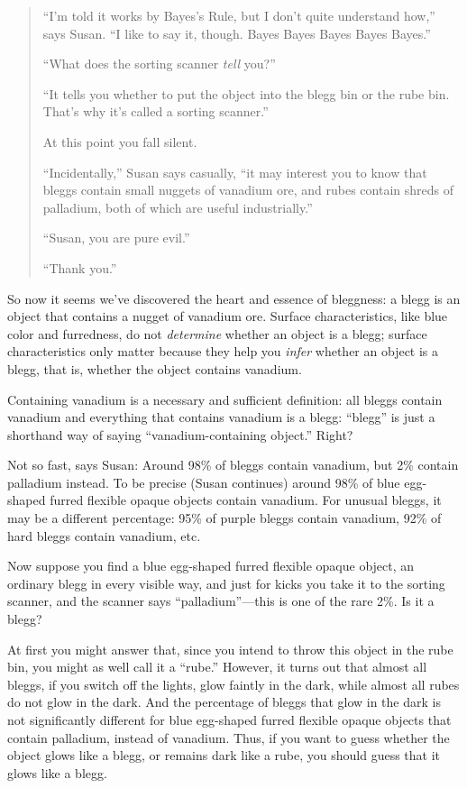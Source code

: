 {\begin{quotation}
 ``I'm told it works by
Bayes's Rule, but I don't quite
understand how,'' says Susan. ``I
like to say it, though. Bayes Bayes Bayes Bayes
Bayes.''


 ``What does the sorting scanner \textit{tell}
you?''


 ``It tells you whether to put the object into the
blegg bin or the rube bin. That's why
it's called a sorting scanner.''


 At this point you fall silent.


 ``Incidentally,'' Susan says
casually, ``it may interest you to know that bleggs
contain small nuggets of vanadium ore, and rubes contain shreds of
palladium, both of which are useful industrially.''


 ``Susan, you are pure evil.''

{
  ``Thank you.''}
\end{quotation}


 So now it seems we've discovered the heart and
essence of bleggness: a blegg is an object that contains a nugget of
vanadium ore. Surface characteristics, like blue color and furredness,
do not \textit{determine} whether an object is a blegg; surface
characteristics only matter because they help you \textit{infer}
whether an object is a blegg, that is, whether the object contains
vanadium.


 Containing vanadium is a necessary and sufficient definition: all
bleggs contain vanadium and everything that contains vanadium is a
blegg: ``blegg'' is just a shorthand
way of saying ``vanadium-containing
object.'' Right?


 Not so fast, says Susan: Around 98\% of bleggs contain vanadium,
but 2\% contain palladium instead. To be precise (Susan continues)
around 98\% of blue egg-shaped furred flexible opaque objects contain
vanadium. For unusual bleggs, it may be a different percentage: 95\% of
purple bleggs contain vanadium, 92\% of hard bleggs contain vanadium,
etc.


 Now suppose you find a blue egg-shaped furred flexible opaque
object, an ordinary blegg in every visible way, and just for kicks you
take it to the sorting scanner, and the scanner says
``palladium''---this is one of the
rare 2\%. Is it a blegg?


 At first you might answer that, since you intend to throw this
object in the rube bin, you might as well call it a
``rube.'' However, it turns out that
almost all bleggs, if you switch off the lights, glow faintly in the
dark, while almost all rubes do not glow in the dark. And the
percentage of bleggs that glow in the dark is not significantly
different for blue egg-shaped furred flexible opaque objects that
contain palladium, instead of vanadium. Thus, if you want to guess
whether the object glows like a blegg, or remains dark like a rube, you
should guess that it glows like a blegg.


}
